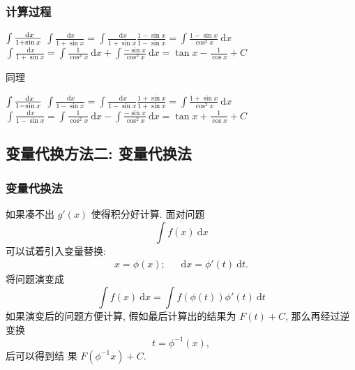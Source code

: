 \documentclass[
10pt,
aspectratio=43,
]{beamer}
\begin{document}
\begin{frame}
	\frametitle{计算过程}
	\everymath{\displaystyle}
	\begin{exampleblock}{$\color{black}\int \frac{\mathrm{~d} x}{1+\sin x}$}
		$
			\int \frac{\mathrm{~d} x}{1+\sin x}=\int \frac{\mathrm{~d} x}{1+\sin x}\frac{1-\sin x}{1-\sin x}=\int \frac{1-\sin x}{\cos^2 x}\mathrm{~d} x
		$
		$
			\int \frac{\mathrm{~d} x}{1+\sin x}=\int \frac{1}{\cos^2 x}\mathrm{~d}x + \int \frac{-\sin x}{\cos^2 x}\mathrm{~d}x=\tan x -\frac{1}{\cos x} +C
		$
	\end{exampleblock}
	\pause
	同理
	\begin{exampleblock}{$\color{black}\int \frac{\mathrm{~d} x}{1-\sin x}$}
		$
			\int \frac{\mathrm{~d} x}{1-\sin x}=\int \frac{\mathrm{~d} x}{1-\sin x}\frac{1+\sin x}{1+\sin x}=\int \frac{1+\sin x}{\cos^2 x}\mathrm{~d} x
		$
		$
			\int \frac{\mathrm{~d} x}{1-\sin x}=\int \frac{1}{\cos^2 x}\mathrm{~d}x - \int \frac{-\sin x}{\cos^2 x}\mathrm{~d}x=\tan x +\frac{1}{\cos x} +C
		$
	\end{exampleblock}
\end{frame}

\subsection{变量代换方法二: 变量代换法}

\begin{frame}
	\frametitle{变量代换法}
	\everymath{\displaystyle}
	如果凑不出 $g'(x)$ 使得积分好计算.
	面对问题
	$$
		\int f(x)\mathrm{~d}x
	$$
	可以试着引入变量替换:
	$$
		\begin{aligned}
			x=\phi(x);\,\,\,\, \,\,\,\,\mathrm{~d}x=\phi'(t)\mathrm{~d}t.
		\end{aligned}
	$$
	将问题演变成
	$$
		\int f(x)\mathrm{~d}x=\int f(\phi(t))\phi'(t)\mathrm{~d}t
	$$
	如果演变后的问题方便计算, 假如最后计算出的结果为 $F(t)+C$, 那么再经过逆变换
	$$
		t=\phi^{-1}(x),
	$$
	后可以得到结 果 $F(\phi^{-1}x)+C$.
\end{frame}
\end{document}
